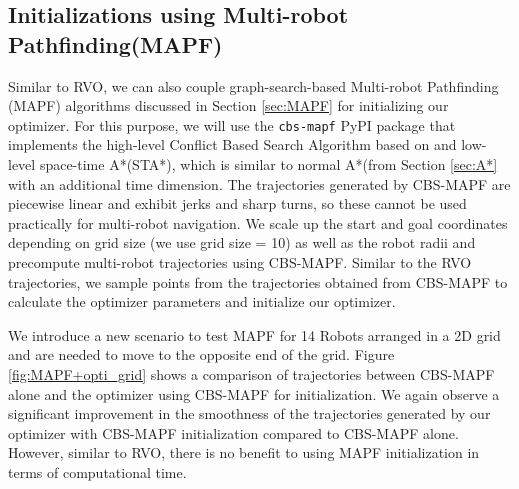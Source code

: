 \subsection{Initializations using Multi-robot Pathfinding(MAPF)\cite{sharon_journal}}\label{sec:appendix-MAPF}

Similar to RVO, we can also couple graph-search-based Multi-robot Pathfinding (MAPF) algorithms discussed in Section \ref{sec:MAPF} for initializing our optimizer. For this purpose, we will use the \texttt{cbs-mapf} PyPI package that implements the high-level Conflict Based Search Algorithm based on \cite{sharon_journal} and low-level space-time A*(STA*), which is similar to normal A*(from Section \ref{sec:A*} with an additional time dimension. The trajectories generated by CBS-MAPF are piecewise linear and exhibit jerks and sharp turns, so these cannot be used practically for multi-robot navigation. We scale up the start and goal coordinates depending on grid size (we use grid size = 10) as well as the robot radii and precompute multi-robot trajectories using CBS-MAPF. Similar to the RVO trajectories, we sample points from the trajectories obtained from CBS-MAPF to calculate the optimizer parameters and initialize our optimizer. 

We introduce a new scenario to test MAPF for 14 Robots arranged in a 2D grid and are needed to move to the opposite end of the grid. Figure \ref{fig:MAPF+opti_grid} shows a comparison of trajectories between CBS-MAPF alone and the optimizer using CBS-MAPF for initialization. We again observe a significant improvement in the smoothness of the trajectories generated by our optimizer with CBS-MAPF initialization compared to CBS-MAPF alone. However, similar to RVO, there is no benefit to using MAPF initialization in terms of computational time. 

